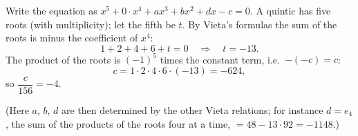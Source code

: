 Write the equation as $x^5+0\cdot x^4+ax^3+bx^2+dx-c=0$. A quintic has five roots (with multiplicity); let the fifth be $t$. By Vieta's formulas the sum of the roots is minus the coefficient of $x^4$:
\[
1+2+4+6+t=0\quad\Longrightarrow\quad t=-13 .
\]
The product of the roots is $(-1)^5$ times the constant term, i.e.\ $-(-c)=c$:
\[
c=1\cdot2\cdot4\cdot6\cdot(-13)=-624,
\]
so $\dfrac{c}{156}=\boxed{-4}$.

(Here $a$, $b$, $d$ are then determined by the other Vieta relations; for instance $d=e_4$, the sum of the products of the roots four at a time, $=48-13\cdot92=-1148$.)
